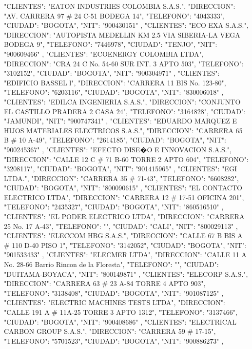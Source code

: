    {
   "CLIENTES": "EATON INDUSTRIES COLOMBIA S.A.S.",
   "DIRECCION": "AV. CARRERA 97 # 24 C-51 BODEGA 14",
   "TELEFONO": "4043333",
   "CIUDAD": "BOGOTA",
   "NIT": "900430151"
   },
   {
   "CLIENTES": "ECO EXA S.A.S.",
   "DIRECCION": "AUTOPISTA MEDELLIN KM 2.5 VIA SIBERIA-LA VEGA BODEGA 9",
   "TELEFONO": "7446978",
   "CIUDAD": "TENJO",
   "NIT": "900609466"
   },
   {
   "CLIENTES": "ECOENERGY COLOMBIA LTDA",
   "DIRECCION": "CRA 24 C No. 54-60 SUR INT. 3 APTO 503",
   "TELEFONO": "3102152",
   "CIUDAD": "BOGOTA",
   "NIT": "900304971"
   },
   {
   "CLIENTES": "EDIFICIO BASSEL l",
   "DIRECCION": "CARRERA 11 BIS No. 123-80",
   "TELEFONO": "6203116",
   "CIUDAD": "BOGOTA",
   "NIT": "830006018"
   },
   {
   "CLIENTES": "EDILCA INGENIERIA S.A.S.",
   "DIRECCION": "CONJUNTO EL CASTILLO PRADERA 2 CASA 24",
   "TELEFONO": "3164828",
   "CIUDAD": "JAMUNDI",
   "NIT": "900747341"
   },
   {
   "CLIENTES": "EDUARDO MARQUEZ E HIJOS MATERIALES ELECTRICOS S.A.S.",
   "DIRECCION": "CARRERA 65 B # 10 A-49",
   "TELEFONO": "2614185",
   "CIUDAD": "BOGOTA",
   "NIT": "900245367"
   },
   {
   "CLIENTES": "EFECTO DISE�O E INNOVACION S.A.S.",
   "DIRECCION": "CALLE 12 C # 71 B-60 TORRE 2 APTO 604",
   "TELEFONO": "3208117",
   "CIUDAD": "BOGOTA",
   "NIT": "901415965"
   },
   {
   "CLIENTES": "EGI LTDA.",
   "DIRECCION": "CARRERA 35 # 71-43",
   "TELEFONO": "6608282",
   "CIUDAD": "BOGOTA",
   "NIT": "800090615"
   },
   {
   "CLIENTES": "EL CONTACTO ELECTRICO LTDA",
   "DIRECCION": "CARRERA 12 # 17-51 OFICINA 201",
   "TELEFONO": "2435327",
   "CIUDAD": "BOGOTA",
   "NIT": "860516510"
   },
   {
   "CLIENTES": "EL PODER ELECTRICO LTDA",
   "DIRECCION": "CARRERA 25 No. 17 A-43",
   "TELEFONO": "",
   "CIUDAD": "CALI",
   "NIT": "800029113"
   },
   {
   "CLIENTES": "ELECCOM HBG S.A.S.",
   "DIRECCION": "CALLE 67 B BIS A # 110 D-40 PISO 1",
   "TELEFONO": "3142052",
   "CIUDAD": "BOGOTA",
   "NIT": "901533433"
   },
   {
   "CLIENTES": "ELECMER LTDA",
   "DIRECCION": "CALLE 11 A No. 28-66 Barrio Rincon de la Floresta",
   "TELEFONO": "",
   "CIUDAD": "DUITAMA-BOYACA",
   "NIT": "800149871"
   },
   {
   "CLIENTES": "ELECORP S.A.S.",
   "DIRECCION": "CARRERA 63 # 23 A-84 TORRE 4 APTO 903",
   "TELEFONO": "3138408",
   "CIUDAD": "BOGOTA",
   "NIT": "901087125"
   },
   {
   "CLIENTES": "ELECTRIC MACHINES TESTS LTDA",
   "DIRECCION": "CALLE 191 A # 11A-25 TORRE 3 APTO 1312",
   "TELEFONO": "3137466",
   "CIUDAD": "BOGOTA",
   "NIT": "900408686"
   },
   {
   "CLIENTES": "ELECTRICAL CARBON GROUP S.A.S.",
   "DIRECCION": "CARRERA 59 # 17-15",
   "TELEFONO": "5701523",
   "CIUDAD": "BOGOTA",
   "NIT": "900886273"
   },
